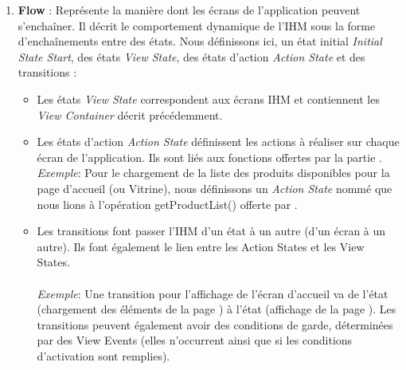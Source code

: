 \begin{enumerate}
\item \textbf{Flow} : Représente la manière dont les écrans de l'application peuvent s'enchaîner. Il décrit le comportement dynamique de l'\textsc{IHM} sous la forme d'enchaînements entre des états. Nous définissons ici, un état initial \textit{Initial State Start}, des états \textit{View State}, des états d'action \textit{Action State} et des transitions :
\begin{itemize}
\item Les états \textit{View State} correspondent aux écrans \textsc{IHM} et contiennent les \textit{View Container} décrit précédemment.
\item Les états d'action \textit{Action State} définissent les actions à réaliser sur chaque écran de l'application. Ils sont liés aux fonctions offertes par la partie \kwsoa{}. 
\textit{Exemple}: Pour le chargement de la liste des produits disponibles pour la page d'accueil (ou Vitrine), nous définissons un \textit{Action State} nommé  que nous lions à l'opération getProductList() offerte par \kwsoa{}.  
\item Les transitions  font passer l'\textsc{IHM} d'un état à un autre (d'un écran à un autre). Ils font également le lien entre les Action States et les View States. 
\paragraph{}
\textit{Exemple}: Une transition pour l'affichage de l'écran d'accueil  va de l'état  (chargement des éléments de la page ) à l'état  (affichage de la page ).
\newline
Les transitions peuvent également avoir des conditions de garde, déterminées par des View Events (elles n'occurrent ainsi que si les conditions d'activation sont remplies).
\end{itemize}
\end{enumerate}       


